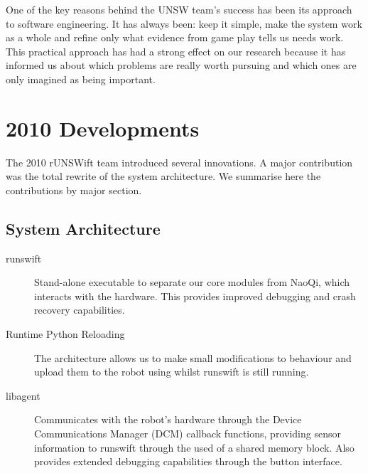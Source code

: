 \documentclass[pdftex,11pt,a4paper]{report}
\begin{document}
One of the key reasons behind the UNSW team's success has been its approach to software engineering. It has always been: keep it simple, make the system work as a whole and refine only what evidence from game play tells us needs work. This practical approach has had a strong effect on our research because it has informed us about which problems are really worth pursuing and which ones are only imagined as being important.

\section{2010 Developments}
The 2010 rUNSWift team introduced several innovations. A major contribution was the total rewrite of the system architecture. We summarise here the contributions by major section. 
\subsection{System Architecture}
\begin{description}
\item[runswift] Stand-alone executable to separate our core modules from NaoQi, which interacts with the hardware. This provides improved debugging and crash recovery capabilities.
\item[Runtime Python Reloading] The architecture allows us to make small modifications to behaviour and upload them to the robot using whilst runswift is still running.
\item[libagent] Communicates with the robot's hardware through the Device Communications Manager (DCM) callback functions, providing sensor information to runswift through the used of a shared memory block. Also provides extended debugging capabilities through the button interface.
\end{description}
\end{document}
